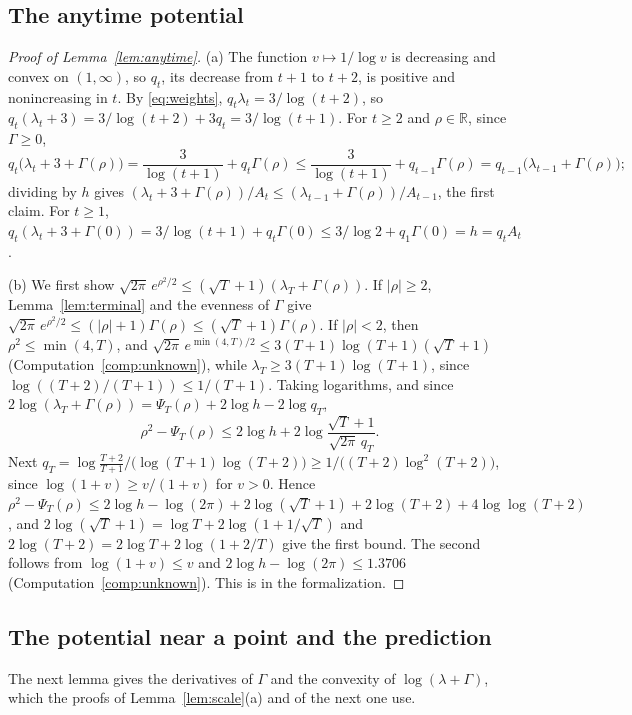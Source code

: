 \documentclass[12pt]{amsart}
\theoremstyle{definition}
\numberwithin{equation}{section}
\newcommand{\R}{\mathbb{R}}
\begin{document}
\subsection{The anytime potential}

\begin{proof}[Proof of Lemma~\ref{lem:anytime}]
(a) The function $v\mapsto1/\log v$ is decreasing and convex on $(1,\infty)$, so $q_t$, its decrease from $t+1$ to $t+2$, is positive and nonincreasing in $t$. By \eqref{eq:weights}, $q_t\lambda_t=3/\log(t+2)$, so $q_t(\lambda_t+3)=3/\log(t+2)+3q_t=3/\log(t+1)$. For $t\ge2$ and $\rho\in\R$, since $\Gamma\ge0$,
\[
q_t\bigl(\lambda_t+3+\Gamma(\rho)\bigr)=\frac3{\log(t+1)}+q_t\Gamma(\rho)\le\frac3{\log(t+1)}+q_{t-1}\Gamma(\rho)=q_{t-1}\bigl(\lambda_{t-1}+\Gamma(\rho)\bigr);
\]
dividing by $h$ gives $(\lambda_t+3+\Gamma(\rho))/A_t\le(\lambda_{t-1}+\Gamma(\rho))/A_{t-1}$, the first claim. For $t\ge1$, $q_t(\lambda_t+3+\Gamma(0))=3/\log(t+1)+q_t\Gamma(0)\le3/\log2+q_1\Gamma(0)=h=q_tA_t$.

(b) We first show $\sqrt{2\pi}\,e^{\rho^2/2}\le(\sqrt T+1)(\lambda_T+\Gamma(\rho))$. If $|\rho|\ge2$, Lemma~\ref{lem:terminal} and the evenness of $\Gamma$ give $\sqrt{2\pi}\,e^{\rho^2/2}\le(|\rho|+1)\Gamma(\rho)\le(\sqrt T+1)\Gamma(\rho)$. If $|\rho|<2$, then $\rho^2\le\min(4,T)$, and $\sqrt{2\pi}\,e^{\min(4,T)/2}\le3(T+1)\log(T+1)(\sqrt T+1)$ (Computation~\ref{comp:unknown}), while $\lambda_T\ge3(T+1)\log(T+1)$, since $\log((T+2)/(T+1))\le1/(T+1)$. Taking logarithms, and since $2\log(\lambda_T+\Gamma(\rho))=\Psi_T(\rho)+2\log h-2\log q_T$,
\[
\rho^2-\Psi_T(\rho)\le2\log h+2\log\frac{\sqrt T+1}{\sqrt{2\pi}\,q_T} .
\]
Next $q_T=\log\frac{T+2}{T+1}\big/\bigl(\log(T+1)\log(T+2)\bigr)\ge1/\bigl((T+2)\log^2(T+2)\bigr)$, since $\log(1+v)\ge v/(1+v)$ for $v>0$. Hence $\rho^2-\Psi_T(\rho)\le2\log h-\log(2\pi)+2\log(\sqrt T+1)+2\log(T+2)+4\log\log(T+2)$, and $2\log(\sqrt T+1)=\log T+2\log(1+1/\sqrt T)$ and $2\log(T+2)=2\log T+2\log(1+2/T)$ give the first bound. The second follows from $\log(1+v)\le v$ and $2\log h-\log(2\pi)\le1.3706$ (Computation~\ref{comp:unknown}). This is  in the formalization.
\end{proof}

\subsection{The potential near a point and the prediction}
The next lemma gives the derivatives of $\Gamma$ and the convexity of $\log(\lambda+\Gamma)$, which the proofs of Lemma~\ref{lem:scale}(a) and of the next one use.
\end{document}
